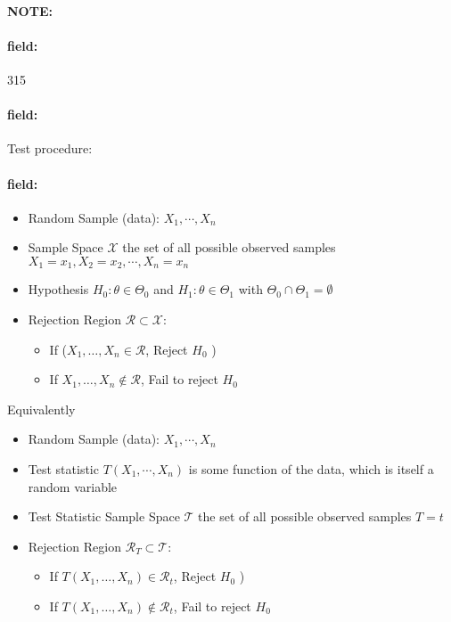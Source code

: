 \documentclass[12pt]{article}
\newenvironment{note}{\paragraph{NOTE:}}{}
\newenvironment{field}{\paragraph{field:}}{}
\begin{document}
\begin{note}
    \begin{field}
        \tiny 315
    \end{field}
    \begin{field}
        Test procedure:
    \end{field}
    \begin{field}
        \begin{itemize}
          \item Random Sample (data): $X_1, \cdots, X_n$
          \item Sample Space $\mathscr{X}$ the set of all possible observed samples $X_1 = x_1, X_2 = x_2, \cdots, X_n = x_n$
          \item Hypothesis $H_0: \theta \in \Theta_0$ and $H_1: \theta \in \Theta_1$ with $\Theta_0 \cap \Theta_1 = \emptyset$
          \item Rejection Region $\mathscr{R} \subset \mathscr{X}$:
          \begin{itemize}
            \item If ($X_1, \ldots , X_n \in \mathscr{R}$, Reject $H_0$ )
            \item If $X_1, \ldots , X_n \not\in \mathscr{R}$, Fail to reject $H_0$
          \end{itemize}
        \end{itemize}

        Equivalently

        \begin{itemize}
          \item Random Sample (data): $X_1, \cdots, X_n$
          \item Test statistic $ T(X_1, \cdots, X_n)$ is some function of the data, which is itself a random variable
          \item Test Statistic Sample Space $\mathscr{T}$ the set of all possible observed samples $T = t$
          \item Rejection Region $\mathscr{R}_T \subset \mathscr{T}$:
          \begin{itemize}
            \item If $T(X_1, \ldots , X_n) \in \mathscr{R}_t$, Reject $H_0$ )
            \item If $T(X_1, \ldots , X_n) \not\in \mathscr{R}_t$, Fail to reject $H_0$
          \end{itemize}
        \end{itemize}
    \end{field}
\end{note}
\end{document}
